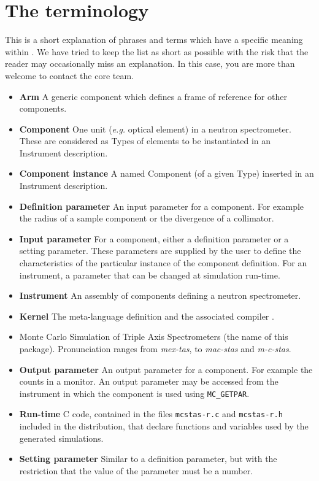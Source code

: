 
\chapter{The \MCS terminology}
\label{s:terminology}

This is a short explanation of phrases and terms which have a specific
meaning within \MCS. We have tried to keep the list as short
as possible with the risk that the reader may occasionally miss
an explanation. In this case, you are more than welcome to contact
the \MCS core team.

\noindent
\begin{itemize}
\item\textbf{Arm}  A generic \MCS component which defines a frame of reference
      for other components.
\item\textbf{Component} One unit ({\em e.g.} optical element) in a neutron
      spectrometer. These are considered as Types of elements to be instantiated in an Instrument description.
\item\textbf{Component instance} A named Component (of a given Type) inserted in an Instrument description.
\item\textbf{Definition parameter} An input parameter for a component. For
  example the radius of a sample component or the divergence of a collimator.
\item\textbf{Input parameter} For a component, either a definition parameter
or a setting parameter. These parameters are supplied by the user to
define the characteristics of the particular instance of the component
definition. For an instrument, a parameter that can be changed at
simulation run-time.
\item\textbf{Instrument} An assembly of \MCS components defining
      a neutron spectrometer.
\item\textbf{Kernel} The \MCS meta-language definition and the associated compiler \mcs.
\item\textbf{\MCS} Monte Carlo Simulation of Triple Axis Spectrometers
       (the name of this package).
  Pronunciation ranges from \emph{mex-tas}, to \emph{mac-stas} and \emph{m-c-stas}.
\item\textbf{Output parameter} An output parameter for a component.
  For example the counts in a monitor. An output parameter may be
  accessed from the instrument in which the component is used using
  \verb`MC_GETPAR`.
\item\textbf{Run-time} C code, contained in the files
  \verb+mcstas-r.c+ and \verb+mcstas-r.h+ included in the \MCS
  distribution, that declare functions and variables used by the
  generated simulations.
\item\textbf{Setting parameter} Similar to a definition parameter, but with the
  restriction that the value of the parameter must be a number.
\end{itemize}
